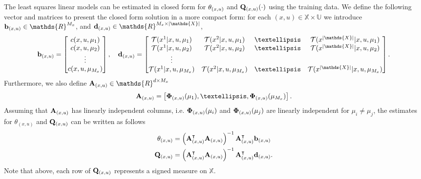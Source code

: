 \documentclass[twoside,11pt]{article}
\begin{document}
The least squares linear models can be estimated in closed form for ${\bf \theta}_{(x,u)}$ and ${\bf Q}_{(x,u)}(\cdot)$ using the training data. We define the following vector and matrices to present the closed form solution in  a more compact form: for each $(x,u)\in\mathds{X}\times\mathds{U}$ we introduce ${\bf b}_{(x,u)} \in \mathds{R}^{M_x}$, and ${\bf d}_{(x,u)} \in \mathds{R}^{M_x\times |\mathds{X}|}$,
\begin{align}\label{lin_fit1}
{\bf b}_{(x,u)} = \begin{bmatrix}
           c(x,u,\mu_1) \\
           c(x,u,\mu_2) \\
           \vdots \\
           c(x,u,\mu_{M_x})
         \end{bmatrix}, \quad {\bf d}_{(x,u)}= \begin{bmatrix}
           \mathcal{T}(x^1|x,u,\mu_1) &  \mathcal{T}(x^2|x,u,\mu_1) & \dots & \mathcal{T}(x^{|\mathds{X}|}|x,u,\mu_1)  \\
           \mathcal{T}(x^1|x,u,\mu_2) &  \mathcal{T}(x^2|x,u,\mu_2) & \dots & \mathcal{T}(x^{|\mathds{X}|}|x,u,\mu_2)\\
           \vdots \\
           \mathcal{T}(x^1|x,u,\mu_{M_x}) &  \mathcal{T}(x^2|x,u,\mu_{M_x}) & \dots & \mathcal{T}(x^{|\mathds{X}|}|x,u,\mu_{M_x})
         \end{bmatrix} .
\end{align}\label{lin_fit2}
Furthermore, we also define ${\bf A}_{(x,u)}\in \mathds{R}^{d\times M_x}$
\begin{align}
{\bf A}_{(x,u)} = \left[ {\bf \Phi}_{(x,u)}(\mu_1), \dots, {\bf \Phi}_{(x,u)}(\mu_{M_x})\right].
\end{align}
Assuming that ${\bf A}_{(x,u)}$ has linearly independent columns, i.e. ${\bf \Phi}_{(x,u)}(\mu_i)$ and ${\bf \Phi}_{(x,u)}(\mu_j)$ are linearly independent for $\mu_i\neq\mu_j$, the estimates for $\theta_{(x,u)}$ and ${\bf Q}_{(x,u)} $ can be written as follows
\begin{align}\label{coor_learn}
\theta_{(x,u)} &= \left({\bf A}^\intercal_{(x,u)} {\bf A}_{(x,u)}\right)^{-1} {\bf A}^\intercal_{(x,u)} {\bf b}_{(x,u)}\nonumber\\
{\bf Q}_{(x,u)}& =  \left({\bf A}^\intercal_{(x,u)} {\bf A}_{(x,u)}\right)^{-1} {\bf A}^\intercal_{(x,u)} {\bf d}_{(x,u)}.
\end{align}
Note that above, each row of ${\bf Q}_{(x,u)}$ represents a signed measure on $\mathds{X}$.
\end{document}
